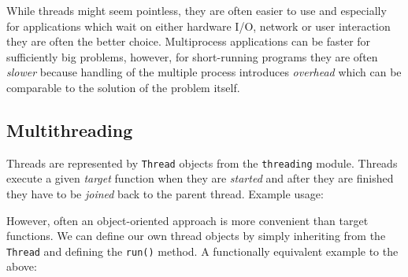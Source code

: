 \documentclass{article}
\newcommand{\ls}[1]{\lstinline{#1}}
\begin{document}
While threads might seem pointless, they are often easier to use and especially for applications which wait on either hardware I/O, network or user interaction they are often the better choice. Multiprocess applications can be faster for sufficiently big problems, however, for short-running programs they are often \emph{slower} because handling of the multiple process introduces \emph{overhead} which can be comparable to the solution of the problem itself.

\subsection{Multithreading}

Threads are represented by \ls{Thread} objects from the \ls{threading} module. Threads execute a given \emph{target} function when they are \emph{started} and after they are finished they have to be \emph{joined} back to the parent thread. Example usage:


However, often an object-oriented approach is more convenient than target functions. We can define our own thread objects by simply inheriting from the \ls{Thread} and defining the \ls{run()} method. A functionally equivalent example to the above:

\end{document}
